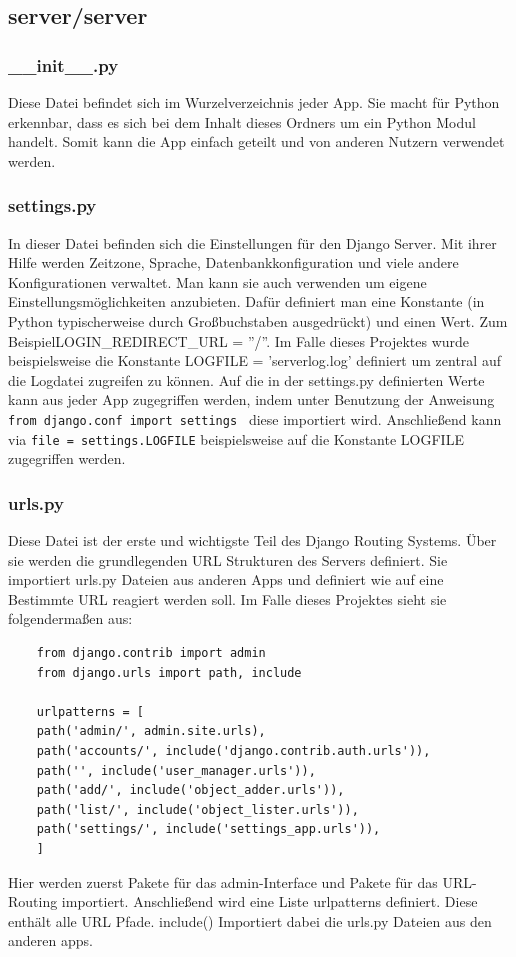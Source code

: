 \documentclass{article}
\begin{document}
\subsection{server/server} 
\subsubsection{\_\_init\_\_.py}
Diese Datei befindet sich im Wurzelverzeichnis jeder App. Sie macht für Python erkennbar, dass es sich bei dem Inhalt dieses Ordners um ein Python Modul handelt. Somit kann die App einfach geteilt und von anderen Nutzern verwendet werden.

\subsubsection{settings.py}
In dieser Datei befinden sich die Einstellungen für den Django Server. Mit ihrer Hilfe werden Zeitzone, Sprache, Datenbankkonfiguration und viele andere Konfigurationen verwaltet. Man kann sie auch verwenden um eigene Einstellungsmöglichkeiten anzubieten. Dafür definiert man eine Konstante (in Python typischerweise durch Großbuchstaben ausgedrückt) und einen Wert. Zum Beispiel\newline LOGIN\_REDIRECT\_URL = ''/''. Im Falle dieses Projektes wurde beispielsweise die Konstante LOGFILE = 'serverlog.log' definiert um zentral auf die Logdatei zugreifen zu können. Auf die in der settings.py definierten Werte kann aus jeder App zugegriffen werden, indem unter Benutzung der Anweisung\newline
 \texttt{from django.conf import settings }  diese importiert wird. Anschließend kann via \texttt{file = settings.LOGFILE} beispielsweise auf die Konstante LOGFILE zugegriffen werden.
 
\subsubsection{urls.py}
Diese Datei ist der erste und wichtigste Teil des Django Routing Systems. Über sie werden die grundlegenden URL Strukturen des Servers definiert. Sie importiert urls.py Dateien aus anderen Apps und definiert wie auf eine Bestimmte URL reagiert werden soll. Im Falle dieses Projektes sieht sie folgendermaßen aus:

\begin{verbatim}
	from django.contrib import admin
	from django.urls import path, include
	
	urlpatterns = [
	path('admin/', admin.site.urls),
	path('accounts/', include('django.contrib.auth.urls')),
	path('', include('user_manager.urls')),
	path('add/', include('object_adder.urls')),
	path('list/', include('object_lister.urls')),
	path('settings/', include('settings_app.urls')),
	]
\end{verbatim}
Hier werden zuerst Pakete für das admin-Interface und Pakete für das URL-Routing importiert. Anschließend wird eine Liste urlpatterns definiert. Diese enthält alle URL Pfade. include() Importiert dabei die urls.py Dateien aus den anderen apps.
\end{document}
